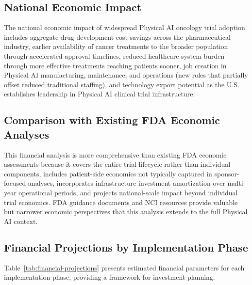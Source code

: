 \subsection{National Economic Impact}
\label{subsec:financial-national}

The national economic impact of widespread Physical AI oncology trial adoption
includes aggregate drug development cost savings across the pharmaceutical
industry, earlier availability of cancer treatments to the broader population
through accelerated approval timelines, reduced healthcare system burden through
more effective treatments reaching patients sooner, job creation in Physical AI
manufacturing, maintenance, and operations (new roles that partially offset
reduced traditional staffing), and technology export potential as the U.S.
establishes leadership in Physical AI clinical trial infrastructure.

\subsection{Comparison with Existing FDA Economic Analyses}
\label{subsec:financial-comparison}

This financial analysis is more comprehensive than existing FDA economic
assessments because it covers the entire trial lifecycle rather than individual
components, includes patient-side economics not typically captured in
sponsor-focused analyses, incorporates infrastructure investment amortization
over multi-year operational periods, and projects national-scale impact beyond
individual trial economics. FDA guidance documents
\cite{fda-clinical-trials-guidance} and NCI resources
\cite{nci-clinical-trials} provide valuable but narrower economic perspectives
that this analysis extends to the full Physical AI context.

\subsection{Financial Projections by Implementation Phase}
\label{subsec:financial-projections}

Table~\ref{tab:financial-projections} presents estimated financial parameters
for each implementation phase, providing a framework for investment planning.


